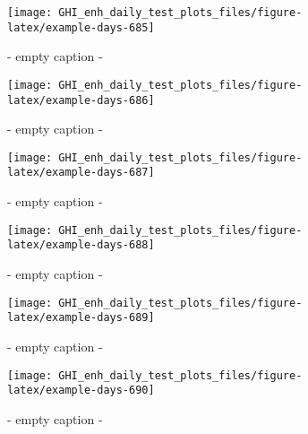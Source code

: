 \documentclass[
  10pt,
  a4paper,oneside]{article}
\begin{document}
\begin{figure}[H]

{\centering \texttt{[image: GHI\_enh\_daily\_test\_plots\_files/figure-latex/example-days-685]} 

}

\caption{ - empty caption - }\label{fig:example-days-685}
\end{figure}

\begin{figure}[H]

{\centering \texttt{[image: GHI\_enh\_daily\_test\_plots\_files/figure-latex/example-days-686]} 

}

\caption{ - empty caption - }\label{fig:example-days-686}
\end{figure}

\begin{figure}[H]

{\centering \texttt{[image: GHI\_enh\_daily\_test\_plots\_files/figure-latex/example-days-687]} 

}

\caption{ - empty caption - }\label{fig:example-days-687}
\end{figure}

\begin{figure}[H]

{\centering \texttt{[image: GHI\_enh\_daily\_test\_plots\_files/figure-latex/example-days-688]} 

}

\caption{ - empty caption - }\label{fig:example-days-688}
\end{figure}

\begin{figure}[H]

{\centering \texttt{[image: GHI\_enh\_daily\_test\_plots\_files/figure-latex/example-days-689]} 

}

\caption{ - empty caption - }\label{fig:example-days-689}
\end{figure}

\begin{figure}[H]

{\centering \texttt{[image: GHI\_enh\_daily\_test\_plots\_files/figure-latex/example-days-690]} 

}

\caption{ - empty caption - }\label{fig:example-days-690}
\end{figure}
\end{document}
